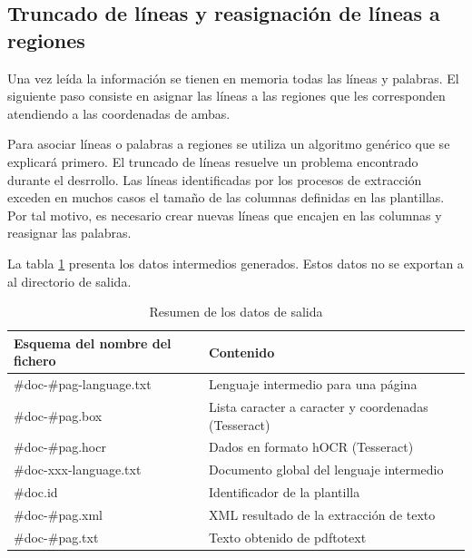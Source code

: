 \subsection{Truncado de líneas y reasignación de líneas a regiones}

Una vez leída la información se tienen en memoria todas las líneas y palabras. El siguiente paso consiste en asignar las líneas a las regiones que les corresponden atendiendo a las coordenadas de ambas.

Para asociar líneas o palabras a regiones se utiliza un algoritmo genérico que se explicará primero. El truncado de líneas resuelve un problema encontrado durante el desrrollo. Las líneas identificadas por los procesos de extracción exceden en muchos casos el tamaño de las columnas definidas en las plantillas. Por tal motivo, es necesario crear nuevas líneas que encajen en las columnas y reasignar las palabras.



La tabla \ref{tab:datos-intermedios} presenta los datos intermedios generados. Estos datos no se exportan a al directorio de salida.

\begin{table}[ht]
    \centering
    \begin{tabular}{l l}
        Esquema del nombre del fichero & Contenido \\
        \hline
        \hline
        \#doc-\#pag-language.txt & Lenguaje intermedio para una página \\
        \#doc-\#pag.box & Lista caracter a caracter y coordenadas (Tesseract) \\
        \#doc-\#pag.hocr & Dados en formato hOCR (Tesseract) \\
        \#doc-xxx-language.txt & Documento global del lenguaje intermedio \\
        \#doc.id & Identificador de la plantilla \\
        \#doc-\#pag.xml & XML resultado de la extracción de texto \\
        \#doc-\#pag.txt & Texto obtenido de pdftotext \\
    \end{tabular}
    \caption{Resumen de los datos de salida}    
    \label{tab:datos-intermedios}
\end{table}

